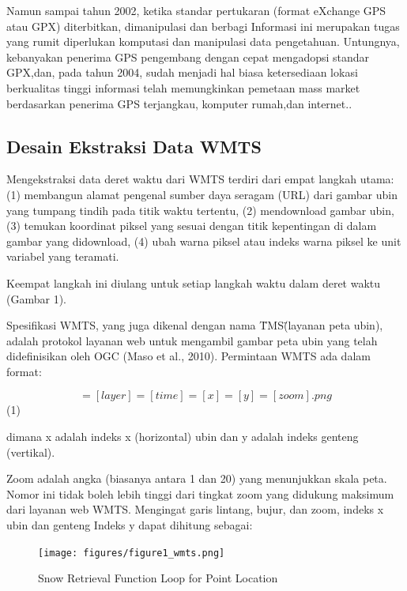 Namun sampai tahun 2002, ketika standar pertukaran (format eXchange GPS atau GPX) diterbitkan, dimanipulasi dan berbagi Informasi ini
merupakan tugas yang rumit diperlukan komputasi dan manipulasi data pengetahuan. Untungnya, kebanyakan penerima GPS pengembang dengan
cepat mengadopsi standar GPX,dan, pada tahun 2004, sudah menjadi hal biasa ketersediaan lokasi berkualitas tinggi informasi telah
memungkinkan pemetaan mass market berdasarkan penerima GPS terjangkau, komputer rumah,dan internet.\cite{haklay2008openstreetmap}. 


\subsection{Desain Ekstraksi Data WMTS}
Mengekstraksi data deret waktu dari WMTS terdiri dari empat langkah utama:
(1) membangun alamat pengenal sumber daya seragam (URL) dari gambar ubin yang tumpang tindih pada titik waktu tertentu, 
(2) mendownload gambar ubin, 
(3) temukan koordinat piksel yang sesuai dengan titik kepentingan di dalam gambar yang didownload,
(4) ubah warna piksel atau indeks warna piksel ke unit variabel yang teramati.

Keempat langkah ini diulang untuk setiap langkah waktu dalam deret waktu (Gambar 1).

Spesifikasi WMTS, yang juga dikenal dengan nama \"TMS\" (layanan peta ubin), adalah protokol layanan web untuk mengambil gambar peta ubin yang telah
didefinisikan oleh OGC (Maso et al., 2010). Permintaan WMTS ada dalam format:

\begin{equation}
	    [server]=[layer]=[time]=[x]=[y]=[zoom].png 
\end{equation}
(1)

dimana x adalah indeks x (horizontal) ubin dan y adalah indeks genteng (vertikal).

Zoom adalah angka (biasanya antara 1 dan 20) yang menunjukkan skala peta. Nomor ini tidak boleh lebih tinggi dari tingkat zoom yang 
didukung maksimum dari layanan web WMTS. Mengingat garis lintang, bujur, dan zoom, indeks x ubin dan genteng
Indeks y dapat dihitung sebagai:

\begin{figure}[ht]

\centerline{\texttt{[image: figures/figure1\_wmts.png]}}

\caption{Snow Retrieval Function Loop for Point Location}

\label{figure1_wmts}

\end{figure}

